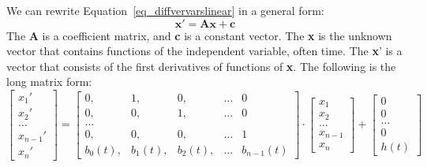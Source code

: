 We can rewrite Equation~\ref{eq_diffvervarslinear} in a general form:
\begin{equation} \label{eq_foode}
  \boldsymbol{x}' = \boldsymbol{Ax} + \boldsymbol{c}
\end{equation}
The \textbf{A} is a coefficient matrix, and \textbf{c} is a constant vector. The \textbf{x} is the unknown vector that contains functions of the independent variable, often time. The \textbf{x}' is a vector that consists of the first derivatives of functions of \textbf{x}. The following is the long matrix form:
\begin{equation} \label{eq_foodeexample}
	\begin{bmatrix}
		x_{1}' \\
    x_{2}' \\
    \dots  \\
    x_{n-1}' \\
    x_{n}'
	\end{bmatrix}
    = 
  \begin{bmatrix}
		0, & 1, & 0, & \dots & 0 \\
    0, & 0, & 1, & \dots & 0 \\
    \dots \\
    0, & 0, & 0, & \dots & 1 \\
    b_{0}(t), & b_{1}(t), & b_{2}(t), & \dots & b_{n-1}(t)
	\end{bmatrix}
    \cdot
  \begin{bmatrix}
		x_{1} \\
    x_{2} \\
    \dots  \\
    x_{n-1} \\
    x_{n}
	\end{bmatrix}
    + 
  \begin{bmatrix}
    0 \\
    0 \\
    \dots  \\
    0 \\
    h(t)
	\end{bmatrix}
\end{equation}




